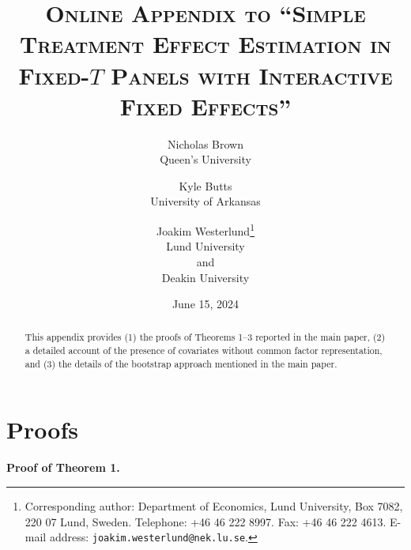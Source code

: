 \documentclass[12pt,fleqn]{article}
\title{\textsc{Online Appendix to ``Simple Treatment Effect Estimation in Fixed-$T$ Panels with Interactive Fixed Effects''}}
\author{
  \and Nicholas Brown\\
  {\small Queen's University} \and Kyle Butts\\
  {\small University of Arkansas} \and Joakim Westerlund\thanks{Corresponding author: Department of Economics, Lund University, Box 7082, 220 07 Lund, Sweden. Telephone: +46 46 222 8997. Fax: +46 46 222 4613. E-mail address: \texttt{joakim.westerlund@nek.lu.se}.}\\
  {\small Lund University}\\
  {\small and}\\
  {\small Deakin University}
}
\date{June 15, 2024}
\begin{document}
\maketitle

\begin{abstract}
\setlength{\baselineskip}{0.83cm}
This appendix provides (1) the proofs of Theorems 1--3 reported in the main paper, (2) a detailed account of the presence of covariates without common factor representation, and (3) the details of the bootstrap approach mentioned in the main paper.
\end{abstract}

\setlength{\baselineskip}{0.83cm}

\section{Proofs}
\renewcommand{\theequation}{A.\arabic{equation}}

\noindent\textbf{Proof of Theorem 1.}

\bigskip
\end{document}
